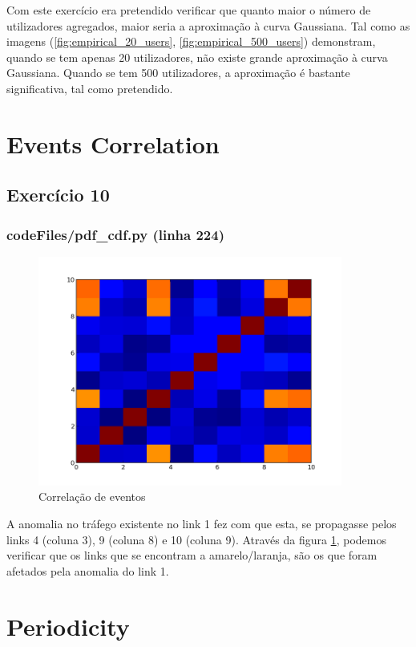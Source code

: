 \documentclass[pdftex,12pt,a4paper]{report}
\begin{document}
Com este exercício era pretendido verificar que quanto maior o número de utilizadores agregados, maior seria a aproximação à curva Gaussiana. Tal como as imagens (\ref{fig:empirical_20_users}, \ref{fig:empirical_500_users}) demonstram, quando se tem apenas 20 utilizadores, não existe grande aproximação à curva Gaussiana. Quando se tem 500 utilizadores, a aproximação é bastante significativa, tal como pretendido.

\newpage
\section{Events Correlation}
\subsection{Exercício 10}
\subsubsection{codeFiles/pdf\_cdf.py (linha 224)}

\begin{figure}[!htb]
\center
 \includegraphics[width=100mm,scale=1]{event_correlation/event_correlation.png}
 \caption{Correlação de eventos}
 \label{fig:event_correlation}
\end{figure}

A anomalia no tráfego existente no link 1 fez com que esta, se propagasse pelos links 4 (coluna 3), 9 (coluna 8) e 10 (coluna 9). Através da figura \ref{fig:event_correlation}, podemos verificar que os links que se encontram a amarelo/laranja, são os que foram afetados pela anomalia do link 1.

\newpage
\section{Periodicity}
\end{document}
